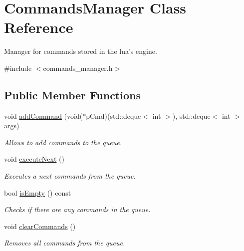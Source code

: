\hypertarget{class_commands_manager}{\section{Commands\-Manager Class Reference}
\label{class_commands_manager}
}


Manager for commands stored in the lua's engine.  




{\ttfamily \#include $<$commands\-\_\-manager.\-h$>$}

\subsection*{Public Member Functions}
\begin{DoxyCompactItemize}
\item 
void \hyperlink{class_commands_manager_a1044e5df37dbb2b174dc9bc6a894d833}{add\-Command} (void($\ast$p\-Cmd)(std\-::deque$<$ int $>$), std\-::deque$<$ int $>$ args)
\begin{DoxyCompactList}\small\item\em Allows to add commands to the queue. \end{DoxyCompactList}\item 
void \hyperlink{class_commands_manager_a6de7776ecdf30cb6cf09d11213c0dd29}{execute\-Next} ()
\begin{DoxyCompactList}\small\item\em Executes a next commands from the queue. \end{DoxyCompactList}\item 
bool \hyperlink{class_commands_manager_a1fe3f32d1a8fed15559bc14acc74aceb}{is\-Empty} () const 
\begin{DoxyCompactList}\small\item\em Checks if there are any commands in the queue. \end{DoxyCompactList}\item 
void \hyperlink{class_commands_manager_aeda6be0792b5078a4e9c259e00d6456f}{clear\-Commands} ()
\begin{DoxyCompactList}\small\item\em Removes all commands from the queue. \end{DoxyCompactList}\end{DoxyCompactItemize}
